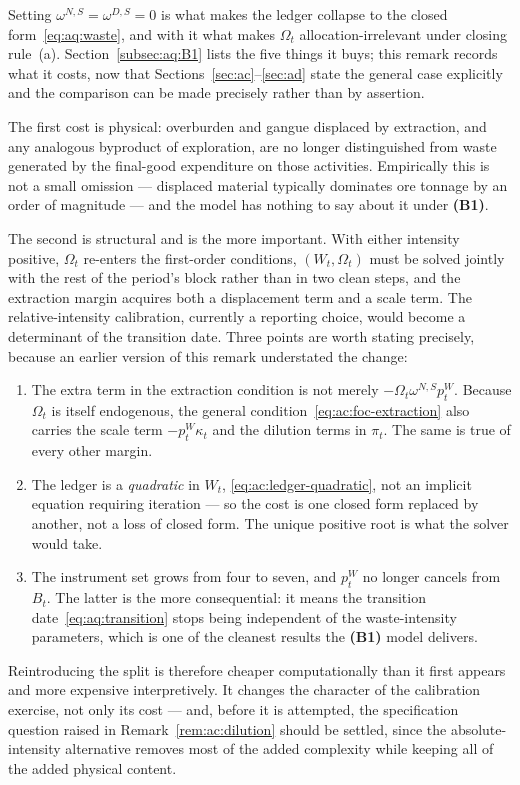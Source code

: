\begin{remark}\label{rem:aq:scope}
Setting $\omega^{N,S}=\omega^{D,S}=0$ is what makes the ledger collapse to the closed form~\eqref{eq:aq:waste}, and with it what makes $\Omega_t$ allocation-irrelevant under closing rule~(a). Section~\ref{subsec:aq:B1} lists the five things it buys; this remark records what it costs, now that Sections~\ref{sec:ac}--\ref{sec:ad} state the general case explicitly and the comparison can be made precisely rather than by assertion.

The first cost is physical: overburden and gangue displaced by extraction, and any analogous byproduct of exploration, are no longer distinguished from waste generated by the final-good expenditure on those activities. Empirically this is not a small omission --- displaced material typically dominates ore tonnage by an order of magnitude --- and the model has nothing to say about it under \textbf{(B1)}.

The second is structural and is the more important. With either intensity positive, $\Omega_t$ re-enters the first-order conditions, $\left(W_t,\Omega_t\right)$ must be solved jointly with the rest of the period's block rather than in two clean steps, and the extraction margin acquires both a displacement term and a scale term. The relative-intensity calibration, currently a reporting choice, would become a determinant of the transition date. Three points are worth stating precisely, because an earlier version of this remark understated the change:
\begin{enumerate}[label=(\arabic*),leftmargin=2.4em,itemsep=0.2em]
\item The extra term in the extraction condition is not merely $-\Omega_t\omega^{N,S}p^W_t$. Because $\Omega_t$ is itself endogenous, the general condition~\eqref{eq:ac:foc-extraction} also carries the scale term $-p^W_t\kappa_t$ and the dilution terms in $\pi_t$. The same is true of every other margin.
\item The ledger is a \emph{quadratic} in $W_t$, \eqref{eq:ac:ledger-quadratic}, not an implicit equation requiring iteration --- so the cost is one closed form replaced by another, not a loss of closed form. The unique positive root is what the solver would take.
\item The instrument set grows from four to seven, and $p^W_t$ no longer cancels from $B_t$. The latter is the more consequential: it means the transition date~\eqref{eq:aq:transition} stops being independent of the waste-intensity parameters, which is one of the cleanest results the \textbf{(B1)} model delivers.
\end{enumerate}
Reintroducing the split is therefore cheaper computationally than it first appears and more expensive interpretively. It changes the character of the calibration exercise, not only its cost --- and, before it is attempted, the specification question raised in Remark~\ref{rem:ac:dilution} should be settled, since the absolute-intensity alternative removes most of the added complexity while keeping all of the added physical content.
\end{remark}

